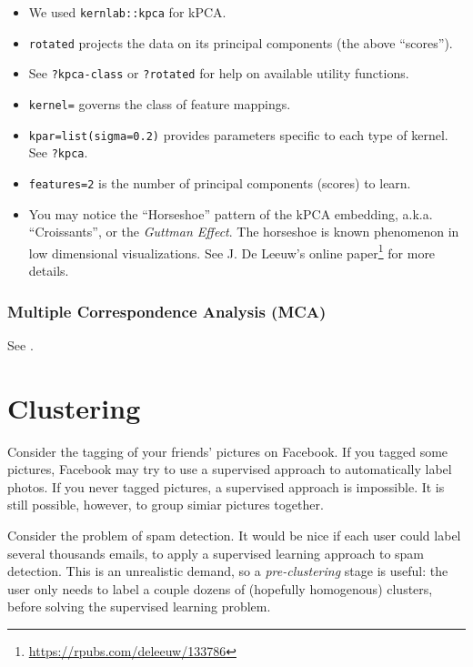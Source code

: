 \documentclass[]{book}
\providecommand{\tightlist}{%
  \setlength{\itemsep}{0pt}\setlength{\parskip}{0pt}}
\renewcommand{\href}[2]{#2\footnote{\url{#1}}}
\theoremstyle{definition}
\theoremstyle{definition}
\theoremstyle{definition}
\theoremstyle{remark}
\let\BeginKnitrBlock\begin \let\EndKnitrBlock\end
\begin{document}
\begin{itemize}
\tightlist
\item
  We used \texttt{kernlab::kpca} for kPCA.
\item
  \texttt{rotated} projects the data on its principal components (the above ``scores'').
\item
  See \texttt{?\textquotesingle{}kpca-class\textquotesingle{}} or \texttt{?rotated} for help on available utility functions.
\item
  \texttt{kernel=} governs the class of feature mappings.
\item
  \texttt{kpar=list(sigma=0.2)} provides parameters specific to each type of kernel. See \texttt{?kpca}.
\item
  \texttt{features=2} is the number of principal components (scores) to learn.
\item
  You may notice the ``Horseshoe'' pattern of the kPCA embedding, a.k.a. ``Croissants'', or the \emph{Guttman Effect}. The horseshoe is known phenomenon in low dimensional visualizations. See \href{https://rpubs.com/deleeuw/133786}{J. De Leeuw's online paper} for more details.
\end{itemize}

\hypertarget{multiple-correspondence-analysis-mca}{%
\subsubsection{Multiple Correspondence Analysis (MCA)}\label{multiple-correspondence-analysis-mca}}

See \citet{izenman2008modern}.

\pagebreak

\hypertarget{cluster}{%
\section{Clustering}\label{cluster}}

\BeginKnitrBlock{example}
\protect\hypertarget{exm:photos}{}{\label{exm:photos} }Consider the tagging of your friends' pictures on Facebook.
If you tagged some pictures, Facebook may try to use a supervised approach to automatically label photos.
If you never tagged pictures, a supervised approach is impossible.
It is still possible, however, to group simiar pictures together.
\EndKnitrBlock{example}

\BeginKnitrBlock{example}
\protect\hypertarget{exm:spam}{}{\label{exm:spam} }Consider the problem of spam detection.
It would be nice if each user could label several thousands emails, to apply a supervised learning approach to spam detection.
This is an unrealistic demand, so a \emph{pre-clustering} stage is useful: the user only needs to label a couple dozens of (hopefully homogenous) clusters, before solving the supervised learning problem.
\EndKnitrBlock{example}
\end{document}
